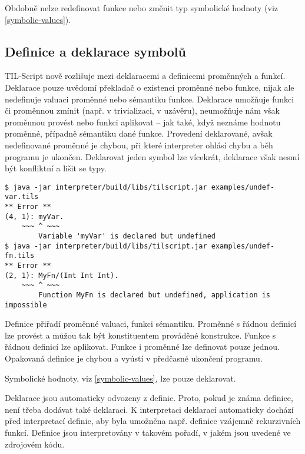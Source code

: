 Obdobně nelze redefinovat funkce nebo změnit typ symbolické hodnoty (viz \ref{symbolic-values}).

\subsection{Definice a deklarace symbolů}

TIL-Script nově rozlišuje mezi deklaracemi a definicemi proměnných a funkcí. Deklarace pouze
uvědomí překladač o existenci proměnné nebo funkce, nijak ale nedefinuje valuaci proměnné nebo
sémantiku funkce. Deklarace umožňuje funkci či proměnnou zmínit (např. v trivializaci, v uzávěru),
neumožňuje nám však proměnnou provést nebo funkci aplikovat -- jak také, když neznáme hodnotu
proměnné, případně sémantiku dané funkce. Provedení deklarované, avšak nedefinované proměnné
je chybou, při které interpreter ohlásí chybu a běh programu je ukončen. Deklarovat jeden symbol
lze vícekrát, deklarace však nesmí být konfliktní a lišit se typy.

\begin{lstlisting}[caption={Hlášení chyby při chybějící definici}]
$ java -jar interpreter/build/libs/tilscript.jar examples/undef-var.tils
** Error **
(4, 1): myVar.
    ~~~ ^ ~~~
        Variable 'myVar' is declared but undefined
$ java -jar interpreter/build/libs/tilscript.jar examples/undef-fn.tils
** Error **
(2, 1): MyFn/(Int Int Int).
    ~~~ ^ ~~~
        Function MyFn is declared but undefined, application is impossible
\end{lstlisting}

Definice přiřadí proměnné valuaci, funkci sémantiku. Proměnné s řádnou definicí lze provést
a můžou tak být konstituentem prováděné konstrukce. Funkce s řádnou definicí lze aplikovat. Funkce
i proměnné lze definovat pouze jednou. Opakovaná definice je chybou a vyústí v předčasné ukončení
programu.

Symbolické hodnoty, viz \ref{symbolic-values}, lze pouze deklarovat.

Deklarace jsou automaticky odvozeny z definic. Proto, pokud je známa definice, není třeba dodávat
také deklaraci. K interpretaci deklarací automaticky dochází před interpretací definic, aby byla
umožněna např. definice vzájemně rekurzivních funkcí. Definice jsou interpretovány v takovém
pořadí, v jakém jsou uvedené ve zdrojovém kódu.

